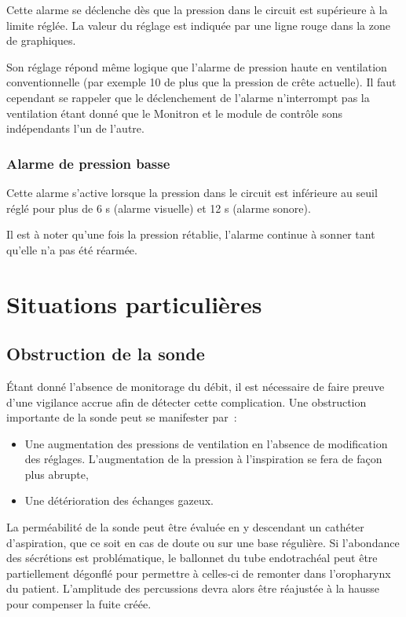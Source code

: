 Cette alarme se déclenche dès que la pression dans le circuit est
supérieure à la limite réglée. La valeur du réglage est indiquée par une
ligne rouge dans la zone de graphiques.

Son réglage répond même logique que l'alarme de pression haute en
ventilation conventionnelle (par exemple 10 \cmh de plus que la
pression de crête actuelle). Il faut cependant se rappeler que le
déclenchement de l'alarme n'interrompt pas la ventilation étant donné
que le Monitron et le module de contrôle sons indépendants l'un de
l'autre.

\subsubsection*{Alarme de pression basse}

Cette alarme s'active lorsque la pression dans le circuit est inférieure
au seuil réglé pour plus de 6 s (alarme visuelle) et 12 s (alarme
sonore).

Il est à noter qu'une fois la pression rétablie, l'alarme continue à
sonner tant qu'elle n'a pas été réarmée.

\section{Situations particulières}

\subsection{Obstruction de la sonde}

Étant donné l'absence de monitorage du débit, il est nécessaire de faire preuve
d'une vigilance accrue afin de détecter cette complication. Une obstruction
importante de la sonde peut se manifester par :
		
\begin{itemize}
	\item Une augmentation des pressions de ventilation en l'absence de
	modification des réglages. L'augmentation de la pression à l'inspiration se
	fera de façon plus abrupte, 
	\item Une détérioration des échanges gazeux.
\end{itemize}

La perméabilité de la sonde peut être évaluée en y descendant un cathéter
d'aspiration, que ce soit en cas de doute ou sur une base régulière.  Si
l'abondance des sécrétions est problématique, le ballonnet du tube endotrachéal
peut être partiellement dégonflé pour permettre à celles-ci de remonter dans
l'oropharynx du patient. L'amplitude des percussions devra alors être réajustée
à la hausse pour compenser la fuite créée.

